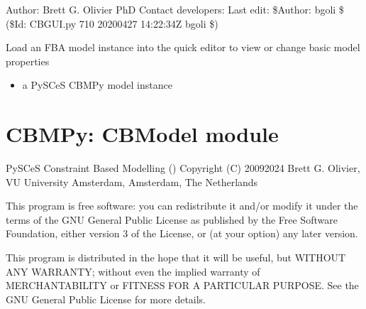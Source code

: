 \documentclass[letterpaper,10pt,english]{sphinxmanual}
\begin{document}
\sphinxAtStartPar
Author: Brett G. Olivier PhD
Contact developers: 
Last edit: \$Author: bgoli \$ (\$Id: CBGUI.py 710 2020\sphinxhyphen{}04\sphinxhyphen{}27 14:22:34Z bgoli \$)

\begin{fulllineitems}
\label{\detokenize{modules_doc:cbmpy.CBGUI.loadCBGUI}}
\pysigstartsignatures
{}
\pysigstopsignatures
\sphinxAtStartPar
Load an FBA model instance into the quick editor to view or change basic model properties
\begin{itemize}
\item {} 
\sphinxAtStartPar
{} a PySCeS CBMPy model instance

\end{itemize}

\end{fulllineitems}

\label{\detokenize{modules_doc:module-cbmpy.CBModel}}

\section{CBMPy: CBModel module}
\label{\detokenize{modules_doc:cbmpy-cbmodel-module}}
\sphinxAtStartPar
PySCeS Constraint Based Modelling ()
Copyright (C) 2009\sphinxhyphen{}2024 Brett G. Olivier, VU University Amsterdam, Amsterdam, The Netherlands

\sphinxAtStartPar
This program is free software: you can redistribute it and/or modify
it under the terms of the GNU General Public License as published by
the Free Software Foundation, either version 3 of the License, or
(at your option) any later version.

\sphinxAtStartPar
This program is distributed in the hope that it will be useful,
but WITHOUT ANY WARRANTY; without even the implied warranty of
MERCHANTABILITY or FITNESS FOR A PARTICULAR PURPOSE.  See the
GNU General Public License for more details.
\end{document}
